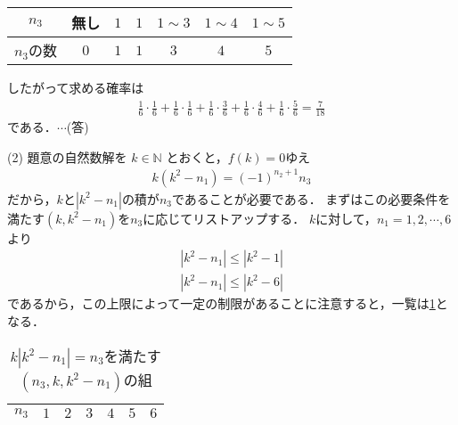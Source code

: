 \documentclass[a4paper,10pt]{ltjsarticle}
\begin{document}
\begin{multicols}{2}
\begin{table}[H]
\begin{tabular}{|c||c|c|c|c|c|c|}
      \hline
      $n_3$   & 無し  & $1$ & $1$ & $1 \sim 3$ & $1 \sim 4$ & $1 \sim 5$ \\
      \hline
      $n_3$の数 & $0$ & $1$ & $1$ & $3$        & $4$        & $5$        \\
      \hline
    \end{tabular}
  \end{table}
  したがって求める確率は
  \begin{align*}
    \frac{1}{6}\cdot\frac{1}{6}
    + \frac{1}{6}\cdot\frac{1}{6}
    + \frac{1}{6}\cdot\frac{3}{6}
    + \frac{1}{6}\cdot\frac{4}{6}
    + \frac{1}{6}\cdot\frac{5}{6} = \frac{7}{18}
  \end{align*}
  である．$\cdots$(答)

  \vspace{10pt}
  (2) 題意の自然数解を $k\in\mathbb{N}$ とおくと，$f(k)=0$ゆえ
  \begin{align*}
    k(k^2 - n_1) = (-1)^{n_2+1} n_3
  \end{align*}
  だから，$k$と$|k^2-n_1|$の積が$n_3$であることが必要である．
  まずはこの必要条件を満たす$(k,k^2-n_1)$を$n_3$に応じてリストアップする．
  $k$に対して，$n_1=1,2,\cdots,6$より
  \begin{align*}
    |k^2-n_1| \le |k^2-1| \\
    |k^2-n_1| \le |k^2-6|
  \end{align*}
  であるから，この上限によって一定の制限があることに注意すると，一覧は\cref{table:3}となる．
  \begin{table}[H]
    \centering
    \caption{$k|k^2-n_1|=n_3$を満たす$(n_3,k,k^2-n_1)$の組}
    \label{table:3}
    \begin{tabular}{|c||c|c|c|c|c|c|}
      \hline
      $n_3$                                                                     & $1$                                     & $2$                                        & $3$                                     & $4$                                        & $5$                                     & $6$                                     \\
      \hline

\end{tabular}
\end{table}
\end{multicols}
\end{document}

